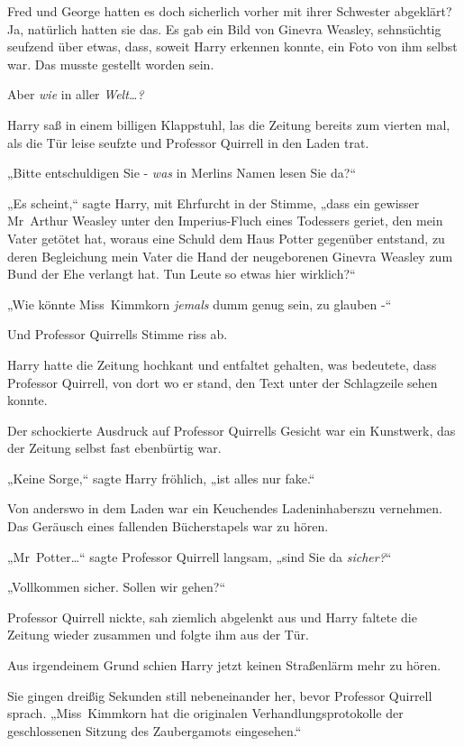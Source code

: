 {Fred und George hatten es doch sicherlich vorher mit ihrer Schwester abgeklärt? Ja, natürlich hatten sie das. Es gab ein Bild von Ginevra Weasley, sehnsüchtig seufzend über etwas, dass, soweit Harry erkennen konnte, ein Foto von ihm selbst war. Das musste gestellt worden sein.

Aber \emph{wie} in aller \emph{Welt…?}

Harry saß in einem billigen Klappstuhl, las die Zeitung bereits zum vierten mal, als die Tür leise seufzte und Professor Quirrell in den Laden trat.

„Bitte entschuldigen Sie - \emph{was} in Merlins Namen lesen Sie da?“

„Es scheint,“ sagte Harry, mit Ehrfurcht in der Stimme, „dass ein gewisser Mr~Arthur Weasley unter den Imperius-Fluch eines Todessers geriet, den mein Vater getötet hat, woraus eine Schuld dem Haus Potter gegenüber entstand, zu deren Begleichung mein Vater die Hand der neugeborenen Ginevra Weasley zum Bund der Ehe verlangt hat. Tun Leute so etwas hier wirklich?“

„Wie könnte Miss~Kimmkorn \emph{jemals} dumm genug sein, zu glauben -“

Und Professor Quirrells Stimme riss ab.

Harry hatte die Zeitung hochkant und entfaltet gehalten, was bedeutete, dass Professor Quirrell, von dort wo er stand, den Text unter der Schlagzeile sehen konnte.

Der schockierte Ausdruck auf Professor Quirrells Gesicht war ein Kunstwerk, das der Zeitung selbst fast ebenbürtig war.

„Keine Sorge,“ sagte Harry fröhlich, „ist alles nur fake.“

Von anderswo in dem Laden war ein Keuchendes Ladeninhaberszu vernehmen. Das Geräusch eines fallenden Bücherstapels war zu hören.

„Mr~Potter…“ sagte Professor Quirrell langsam, „sind Sie da \emph{sicher?}“

„Vollkommen sicher. Sollen wir gehen?“

Professor Quirrell nickte, sah ziemlich abgelenkt aus und Harry faltete die Zeitung wieder zusammen und folgte ihm aus der Tür.

Aus irgendeinem Grund schien Harry jetzt keinen Straßenlärm mehr zu hören.

Sie gingen dreißig Sekunden still nebeneinander her, bevor Professor Quirrell sprach. „Miss~Kimmkorn hat die originalen Verhandlungsprotokolle der geschlossenen Sitzung des Zaubergamots eingesehen.“

}
